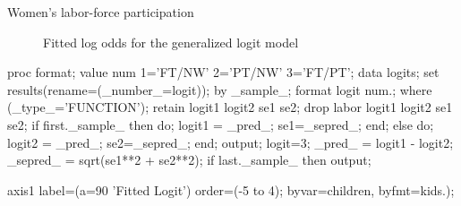 \begin{Example}[wlfpart2]{Women's labor-force participation}
\begin{figure}[htb]
\begin{minipage}[b]{.49\linewidth}
 \end{minipage}
  \caption[Women's Labor Force Participation, fitted log odds]{Fitted log odds for the generalized logit model}\label{fig:wlfpart35}
\end{figure}
\begin{listing}
proc format;
   value num 1='FT/NW'  2='PT/NW'  3='FT/PT';
data logits;
   set results(rename=(_number_=logit));
   by _sample_;
   format logit num.;
   where (_type_='FUNCTION');
   retain logit1 logit2 se1 se2;
   drop labor logit1 logit2 se1 se2;
   if first._sample_
      then do; logit1 = _pred_; se1=_sepred_; end;
      else do; logit2 = _pred_; se2=_sepred_; end;
   output;
   logit=3;
   _pred_ = logit1 - logit2;
   _sepred_ = sqrt(se1**2 + se2**2);
   if last._sample_ then output;

axis1 label=(a=90 'Fitted Logit') order=(-5 to 4);
   byvar=children, byfmt=kids.);
\end{listing}
\end{Example}
